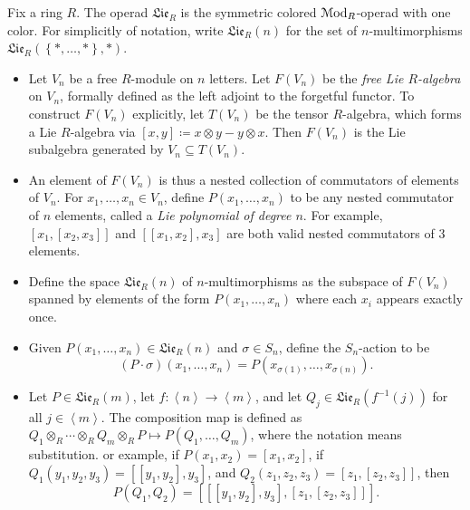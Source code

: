 \begin{definition}\label{2.3.2}
	Fix a ring $R$. The operad $\mathfrak{Lie}_R$ is the symmetric colored $\mathcal{M}\mathrm{od} _R$-operad with one color. For simplicitly of notation, write $\mathfrak{Lie}_R(n)$ for the set of $n$-multimorphisms $\mathfrak{Lie}_R(\left\{ *,\ldots , * \right\} ,*)$.
	\begin{itemize}
		\item Let $V_n$ be a free $R$-module on $n$ letters. Let $F(V_n)$ be the \emph{free Lie $R$-algebra} on $V_n$, formally defined as the left adjoint to the forgetful functor. To construct $F(V_n)$ explicitly, let $T(V_n)$ be the tensor $R$-algebra, which forms a Lie $R$-algebra via $[x,y]\coloneqq x\otimes y-y\otimes x$. Then $F(V_n)$ is the Lie subalgebra generated by $V_n \subseteq T(V_n)$.
		\item An element of $F(V_n)$ is thus a nested collection of commutators of elements of $V_n$. For $x_1, \ldots ,x_n\in V_n$, define $P(x_1, \ldots ,x_n)$ to be any nested commutator of $n$ elements, called a \emph{Lie polynomial of degree $n$}. For example, $[x_1,[x_2,x_3]]$ and $[[x_1,x_2],x_3]$ are both valid nested commutators of $3$ elements.
		\item Define the space $\mathfrak{Lie}_R(n)$ of $n$-multimorphisms as the subspace of $F(V_n)$ spanned by elements of the form $P(x_1, \ldots , x_n)$ where each $x_i$ appears exactly once.
		\item Given $P(x_1, \ldots ,x_n)\in \mathfrak{Lie} _R(n)$ and $\sigma \in S_n$, define the $S_n$-action to be
			\[
				(P\cdot \sigma )(x_1, \ldots ,x_n) = P(x_{\sigma (1)} , \ldots , x_{\sigma (n)} ).
			\]
		\item Let $P\in \mathfrak{Lie} _R(m)$, let $f : \left\langle n \right\rangle  \to \left\langle m \right\rangle $, and let $Q_j\in \mathfrak{Lie}_R(f^{-1} (j))$ for all $j\in \left\langle m \right\rangle $. The composition map is defined as $Q_1 \otimes_R \cdots \otimes _RQ_m \otimes_R P \mapsto P(Q_1, \ldots ,Q_m)$, where the notation means substitution. or example, if $P(x_1, x_2)=[x_1,x_2]$, if $Q_1(y_1, y_2,y_3)=[[y_1,y_2],y_3]$, and $Q_2(z_1,z_2,z_3)=[z_1,[z_2,z_3]]$, then
			\[
				P(Q_1,Q_2) = [[[y_1,y_2],y_3],[z_1,[z_2,z_3]]]
			.\]
	\end{itemize}
\end{definition}

